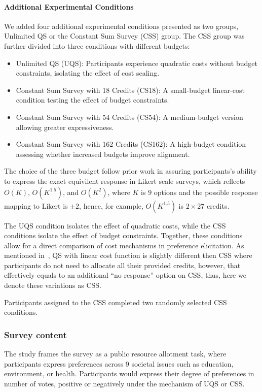\paragraph{Additional Experimental Conditions}
We added four additional experimental conditions presented as two groups, Unlimited QS or the Constant Sum Survey (CSS) group. The CSS group was further divided into three conditions with different budgets:

\begin{itemize}
    \item Unlimited QS (UQS): Participants experience quadratic costs without budget constraints, isolating the effect of cost scaling.
    \item Constant Sum Survey with 18 Credits (CS18): A small-budget linear-cost condition testing the effect of budget constraints.
    \item Constant Sum Survey with 54 Credits (CS54): A medium-budget version allowing greater expressiveness.
    \item Constant Sum Survey with 162 Credits (CS162): A high-budget condition assessing whether increased budgets improve alignment.
\end{itemize}

The choice of the three budget follow prior work in assuring participants's ability to express the exact equivilent response in Likert scale surveys, which reflects $O(K)$, $O(K^{1.5})$, and $O(K^2)$, where $K$ is $9$ options and the possible response mapping to Likert is $\pm2$, hence, for example, $O(K^1.5)$ is $2\times27$ credits.

The UQS condition isolates the effect of quadratic costs, while the CSS conditions isolate the effect of budget constraints. Together, these conditions allow for a direct comparison of cost mechanisms in preference elicitation. As mentioned in~, QS with linear cost function is slightly different then CSS where participants do not need to allocate all their provided credits, however, that effectively equals to an additional ``no response'' option on CSS, thus, here we denote these variations as CSS.

Participants assigned to the CSS completed two randomly selected CSS conditions.

\subsubsection{Survey content}
The study frames the survey as a public resource allotment task, where participants express preferences across 9 societal issues such as education, environment, or health. Participants would express their degree of preferences in number of votes, positive or negatively under the mechanism of UQS or CSS.

